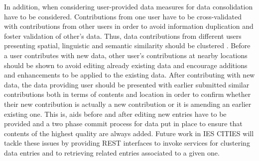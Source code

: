 In addition, when considering user-provided data measures for data consolidation have to be considered. Contributions from one user have to be cross-validated with contributions from other users in order to avoid information duplication and foster validation of other’s data. Thus, data contributions from different users presenting spatial, linguistic and semantic similarity should be clustered \cite{braun_collaborative_2010}. Before a user contributes with new data, other user’s contributions at nearby locations should be shown to avoid editing already existing data and encourage additions and enhancements to be applied to the existing data. After contributing with new data, the data providing user should be presented with earlier submitted similar contributions both in terms of contents and location in order to confirm whether their new contribution is actually a new contribution or it is amending an earlier existing one. This is, aids before and after editing new entries have to be provided and a two phase commit process for data put in place to ensure that contents of the highest quality are always added. Future work in IES CITIES will tackle these issues by providing REST interfaces to invoke services for clustering data entries and to retrieving related entries associated to a given one.
